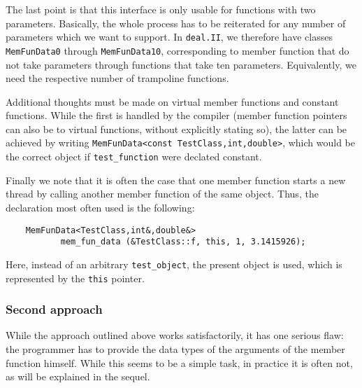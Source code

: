 \documentclass[11pt]{article}
\begin{document}
The last point is that this interface is only usable for functions with two
parameters. Basically, the whole process has to be reiterated for any number
of parameters which we want to support. In \texttt{deal.II}, we therefore have
classes \texttt{MemFunData0} through \texttt{MemFunData10}, corresponding to
member function that do not take parameters through functions that take ten
parameters. Equivalently, we need the respective number of trampoline
functions. 

Additional thoughts must be made on virtual member functions and constant
functions. While the first is handled by the compiler (member function
pointers can also be to virtual functions, without explicitly stating so), the
latter can be achieved by writing 
\texttt{MemFunData<const TestClass,int,double>}, which would be the correct
object if \texttt{test\_function} were declated constant.

Finally we note that it is often the case that one member function starts a
new thread by calling another member function of the same object. Thus, the
declaration most often used is the following:
\begin{verbatim}
    MemFunData<TestClass,int&,double&>  
           mem_fun_data (&TestClass::f, this, 1, 3.1415926);
\end{verbatim}
Here, instead of an arbitrary \texttt{test\_object}, the present object is
used, which is represented by the \texttt{this} pointer.



\subsubsection{Second approach}

While the approach outlined above works satisfactorily, it has one serious
flaw: the programmer has to provide the data types of the arguments of the
member function himself. While this seems to be a simple task, in practice it
is often not, as will be explained in the sequel.
\end{document}
